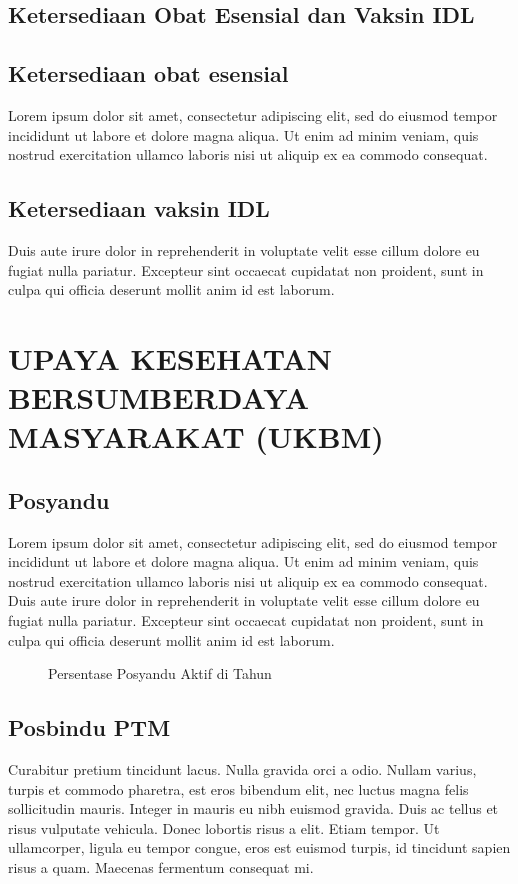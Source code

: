 \subsection{Ketersediaan Obat Esensial dan Vaksin IDL}
\subsection{Ketersediaan obat esensial}
Lorem ipsum dolor sit amet, consectetur adipiscing elit, sed do eiusmod tempor incididunt ut labore et dolore magna aliqua. Ut enim ad minim veniam, quis nostrud exercitation ullamco laboris nisi ut aliquip ex ea commodo consequat.
\subsection{Ketersediaan vaksin IDL}
Duis aute irure dolor in reprehenderit in voluptate velit esse cillum dolore eu fugiat nulla pariatur. Excepteur sint occaecat cupidatat non proident, sunt in culpa qui officia deserunt mollit anim id est laborum.

\section[UKBM]{UPAYA KESEHATAN BERSUMBERDAYA MASYARAKAT (UKBM)}%
\subsection{Posyandu}
Lorem ipsum dolor sit amet, consectetur adipiscing elit, sed do eiusmod tempor incididunt ut labore et dolore magna aliqua. Ut enim ad minim veniam, quis nostrud exercitation ullamco laboris nisi ut aliquip ex ea commodo consequat. Duis aute irure dolor in reprehenderit in voluptate velit esse cillum dolore eu fugiat nulla pariatur. Excepteur sint occaecat cupidatat non proident, sunt in culpa qui officia deserunt mollit anim id est laborum.

\begin{figure}[H]
	\centering{}
	\caption{Persentase Posyandu Aktif di \namaKabupaten Tahun \tP}
	\label{fig:Posyandu-Aktif}
\end{figure}

\subsection{Posbindu PTM}
Curabitur pretium tincidunt lacus. Nulla gravida orci a odio. Nullam varius, turpis et commodo pharetra, est eros bibendum elit, nec luctus magna felis sollicitudin mauris. Integer in mauris eu nibh euismod gravida. Duis ac tellus et risus vulputate vehicula. Donec lobortis risus a elit. Etiam tempor. Ut ullamcorper, ligula eu tempor congue, eros est euismod turpis, id tincidunt sapien risus a quam. Maecenas fermentum consequat mi. 
